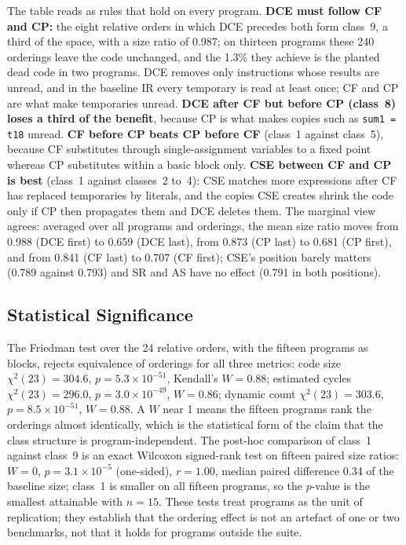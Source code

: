 \documentclass[conference,a4paper]{IEEEtran}
\begin{document}
The table reads as rules that hold on every program. \textbf{DCE must follow CF and CP:} the eight relative orders in which DCE precedes both form class~9, a third of the space, with a size ratio of 0.987; on thirteen programs these 240 orderings leave the code unchanged, and the 1.3\% they achieve is the planted dead code in two programs. DCE removes only instructions whose results are unread, and in the baseline IR every temporary is read at least once; CF and CP are what make temporaries unread. \textbf{DCE after CF but before CP (class~8) loses a third of the benefit}, because CP is what makes copies such as \texttt{sum1 = t18} unread. \textbf{CF before CP beats CP before CF} (class~1 against class~5), because CF substitutes through single-assignment variables to a fixed point whereas CP substitutes within a basic block only. \textbf{CSE between CF and CP is best} (class~1 against classes~2 to~4): CSE matches more expressions after CF has replaced temporaries by literals, and the copies CSE creates shrink the code only if CP then propagates them and DCE deletes them. The marginal view agrees: averaged over all programs and orderings, the mean size ratio moves from 0.988 (DCE first) to 0.659 (DCE last), from 0.873 (CP last) to 0.681 (CP first), and from 0.841 (CF last) to 0.707 (CF first); CSE's position barely matters (0.789 against 0.793) and SR and AS have no effect (0.791 in both positions).

\subsection{Statistical Significance}
\label{sec:stats}
The Friedman test over the 24 relative orders, with the fifteen programs as blocks, rejects equivalence of orderings for all three metrics: code size $\chi^2(23) = 304.6$, $p = 5.3 \times 10^{-51}$, Kendall's $W = 0.88$; estimated cycles $\chi^2(23) = 296.0$, $p = 3.0 \times 10^{-49}$, $W = 0.86$; dynamic count $\chi^2(23) = 303.6$, $p = 8.5 \times 10^{-51}$, $W = 0.88$. A $W$ near 1 means the fifteen programs rank the orderings almost identically, which is the statistical form of the claim that the class structure is program-independent. The post-hoc comparison of class~1 against class~9 is an exact Wilcoxon signed-rank test on fifteen paired size ratios: $W = 0$, $p = 3.1 \times 10^{-5}$ (one-sided), $r = 1.00$, median paired difference 0.34 of the baseline size; class~1 is smaller on all fifteen programs, so the $p$-value is the smallest attainable with $n = 15$. These tests treat programs as the unit of replication; they establish that the ordering effect is not an artefact of one or two benchmarks, not that it holds for programs outside the suite.
\end{document}
